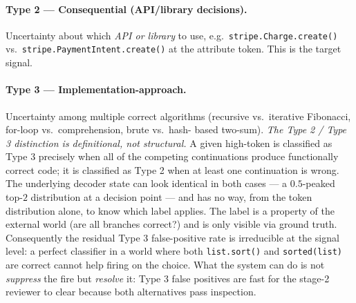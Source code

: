 \paragraph{Type 2 --- Consequential (API/library decisions).}
Uncertainty about which \emph{API or library} to use, e.g.\
\texttt{stripe.Charge.create()} vs.\
\texttt{stripe.PaymentIntent.create()} at the attribute token.
This is the target signal.

\paragraph{Type 3 --- Implementation-approach.}
Uncertainty among multiple correct algorithms (recursive vs.\
iterative Fibonacci, for-loop vs.\ comprehension, brute vs.\ hash-%
based two-sum). \emph{The Type 2 / Type 3 distinction is
definitional, not structural.} A given high-\eps token is classified
as Type 3 precisely when all of the competing continuations produce
functionally correct code; it is classified as Type 2 when at least
one continuation is wrong. The underlying decoder state can look
identical in both cases --- a $0.5$-peaked top-$2$ distribution at a
decision point --- and \eps has no way, from the token distribution
alone, to know which label applies. The label is a property of the
external world (are all branches correct?) and is only visible via
ground truth. Consequently the residual Type 3 false-positive rate
is irreducible at the signal level: a perfect classifier in a world
where both \texttt{list.sort()} and \texttt{sorted(list)} are correct
cannot help firing on the choice. What the system can do is not
\emph{suppress} the fire but \emph{resolve} it: Type 3 false
positives are fast for the stage-2 reviewer to clear because both
alternatives pass inspection.


